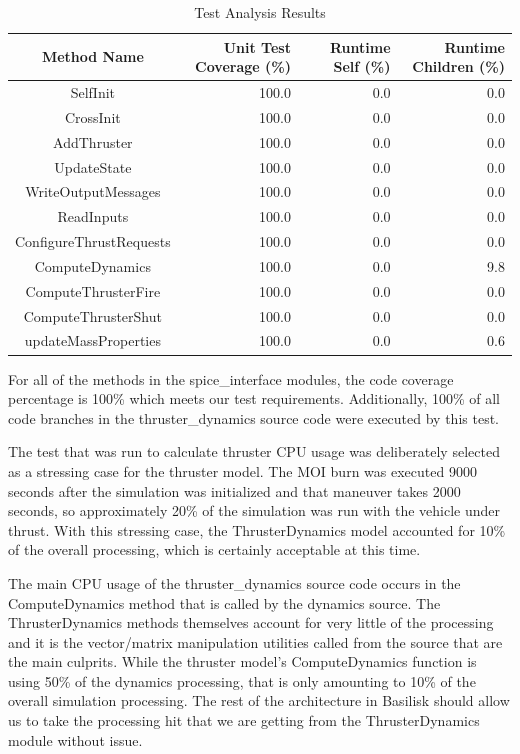 \documentclass[]{LASPreport}
\begin{document}
\begin{table}[htbp]
    \caption{Test Analysis Results}
   \label{tab:cov_met}
        \centering \fontsize{10}{10}\selectfont
   \begin{tabular}{c | r | r | r} %
      \hline
      Method Name    & Unit Test Coverage (\%) & Runtime Self (\%) & Runtime Children (\%) \\
      \hline
      SelfInit & 100.0 & 0.0 & 0.0 \\
      CrossInit & 100.0 & 0.0 & 0.0 \\
      AddThruster & 100.0 & 0.0 & 0.0 \\
      UpdateState & 100.0 & 0.0 & 0.0 \\
      WriteOutputMessages & 100.0 & 0.0 & 0.0 \\
      ReadInputs & 100.0 & 0.0 & 0.0 \\
      ConfigureThrustRequests & 100.0 & 0.0 & 0.0 \\
      ComputeDynamics & 100.0 & 0.0 & 9.8 \\
      ComputeThrusterFire & 100.0 & 0.0 & 0.0 \\
      ComputeThrusterShut & 100.0 & 0.0 & 0.0 \\
      updateMassProperties & 100.0 & 0.0 & 0.6 \\
      \hline
   \end{tabular}
\end{table}

For all of the methods in the spice\_interface modules, the code coverage 
percentage is 100\% which meets our test requirements.  Additionally, 100\% of 
all code branches in the thruster\_dynamics source code were executed by this 
test.

The test that was run to calculate thruster CPU usage was deliberately selected as 
a stressing case for the thruster model.  The MOI burn was executed 9000 seconds 
after the simulation was initialized and that maneuver takes 2000 seconds, so 
approximately 20\% of the simulation was run with the vehicle under thrust.  
With this stressing case, the ThrusterDynamics model accounted for 10\% of the 
overall processing, which is certainly acceptable at this time.

The main CPU usage of the thruster\_dynamics source code occurs in the 
ComputeDynamics method that is called by the dynamics source.  The 
ThrusterDynamics methods themselves account for very little of the processing 
and it is the vector/matrix manipulation utilities called from the source that 
are the main culprits.  While the thruster model's ComputeDynamics function is 
using 50\% of the dynamics processing, that is only amounting to 10\% of the 
overall simulation processing.  The rest of the architecture in Basilisk should 
allow us to take the processing hit that we are getting from the 
ThrusterDynamics module without issue.
\end{document}
